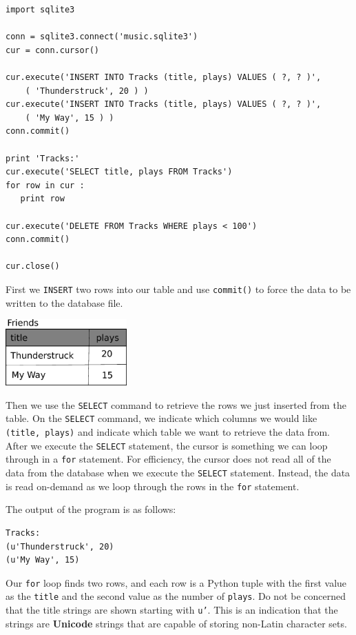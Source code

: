 \documentclass[11pt]{book}
\begin{document}
\beforeverb
\begin{verbatim}
import sqlite3

conn = sqlite3.connect('music.sqlite3')
cur = conn.cursor()

cur.execute('INSERT INTO Tracks (title, plays) VALUES ( ?, ? )', 
    ( 'Thunderstruck', 20 ) )
cur.execute('INSERT INTO Tracks (title, plays) VALUES ( ?, ? )', 
    ( 'My Way', 15 ) )
conn.commit()

print 'Tracks:'
cur.execute('SELECT title, plays FROM Tracks')
for row in cur :
   print row

cur.execute('DELETE FROM Tracks WHERE plays < 100')
conn.commit()

cur.close()
\end{verbatim}
\afterverb
%
First we {\tt INSERT} two rows into our table and use {\tt commit()} 
to force the data to be written to the database file.

\beforefig
\centerline{\includegraphics[height=1.00in]{figs2/tracks.eps}}
\afterfig

Then we use the {\tt SELECT} command
to retrieve the rows we just inserted from the table.  
On the 
{\tt SELECT} command, we indicate which columns we would like {\tt (title, plays)}
and indicate which table we want to retrieve the data from.  After we 
execute the {\tt SELECT} statement, the cursor is something we can loop through
in a {\tt for} statement.   For efficiency,
the cursor does not read all of the data from the
database when we execute the {\tt SELECT} statement.  
Instead, the data is read on-demand
as we loop through the rows in the {\tt for} statement.

The output of the program is as follows:

\beforeverb
\begin{verbatim}
Tracks:
(u'Thunderstruck', 20)
(u'My Way', 15)
\end{verbatim}
\afterverb
%
Our {\tt for} loop finds two rows, and each row is a Python tuple with the
first value as the {\tt title} and the second value as the number of {\tt plays}.
Do not be concerned that the title strings are shown starting with 
{\tt u'}.  This is an indication that the strings are {\bf Unicode} strings
that are capable of storing non-Latin character sets.
\end{document}
